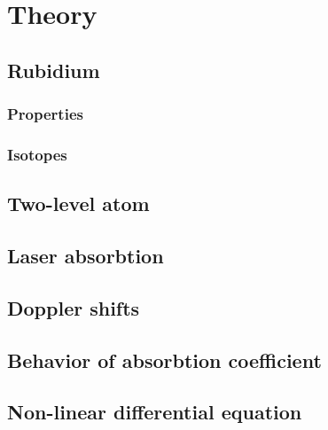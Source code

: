 
\chapter{Theory}  %

\ifpdf
    \graphicspath{{Chapter1/Figs/Raster/}{Chapter1/Figs/PDF/}{Chapter1/Figs/}}
\else
    \graphicspath{{Chapter1/Figs/Vector/}{Chapter1/Figs/}}
\fi


\section{Rubidium} %
\subsection{Properties} %
\subsection{Isotopes} %


\section{Two-level atom} %


\section{Laser absorbtion} %


\section{Doppler shifts}  %


\section{Behavior of absorbtion coefficient}  %


\section{Non-linear differential equation}  %

